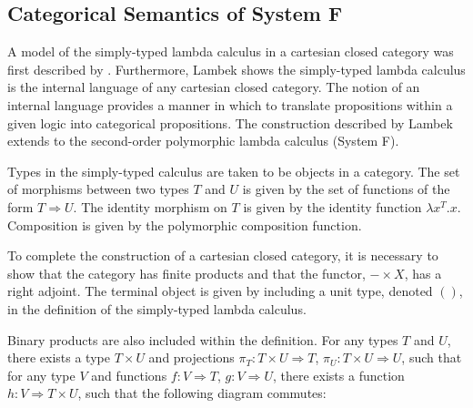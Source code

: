 \documentclass[../../Dissertation.tex]{subfiles}
\begin{document}
\subsection{Categorical Semantics of System F}\label{sec:systemfcat}
A model of the simply-typed lambda calculus in a cartesian closed category was first described by . Furthermore, Lambek shows the simply-typed lambda calculus is the internal language of any cartesian closed category. The notion of an internal language provides a manner in which to translate propositions within a given logic into categorical propositions. The construction described by Lambek extends to the second-order polymorphic lambda calculus (System F).
\par
Types in the simply-typed calculus are taken to be objects in a category. The set of morphisms between two types $T$ and $U$ is given by the set of functions of the form $T \Rightarrow U$. The identity morphism on $T$ is given by the identity function $\lambda x^T.x$. Composition is given by the polymorphic composition function.
\par
To complete the construction of a cartesian closed category, it is necessary to show that the category has finite products and that the functor, $- \times X$, has a right adjoint. The terminal object is given by including a unit type, denoted $()$, in the definition of the simply-typed lambda  calculus. 
\par
Binary products are also included within the definition. For any types $T$ and $U$, there exists a type $T \times U$ and projections $\pi_{T} : T \times U \Rightarrow T$, $\pi_{U} : T \times U \Rightarrow U$, such that for any type $V$ and functions $f : V \Rightarrow T$, $g : V \Rightarrow U$, there exists a function $h : V \Rightarrow T \times U$, such that the following diagram commutes:
\end{document}

